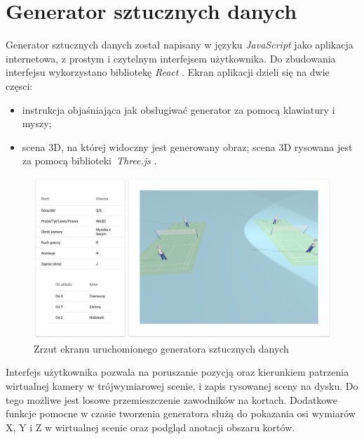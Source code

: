 \newpage
\section{Generator sztucznych danych}

Generator sztucznych danych został napisany w języku \textit{JavaScript} jako aplikacja internetowa, z prostym i czytelnym interfejsem użytkownika.
Do zbudowania interfejsu wykorzystano bibliotekę \textit{React} \cite{react}.
Ekran aplikacji dzieli się na dwie częsci:
\begin{itemize}
  \item instrukcja objaśniająca jak obsługiwać generator za pomocą klawiatury i myszy;
  \item scena 3D, na której widoczny jest generowany obraz; scena 3D rysowana jest za pomocą biblioteki~\textit{Three.js} \cite{threejs}.
\end{itemize}

\begin{figure}[!htb]
  \includegraphics[width=\linewidth]{./generator_3.png}
    \caption{Zrzut ekranu uruchomionego generatora sztucznych danych}
\end{figure}

Interfejs użytkownika pozwala na poruszanie pozycją oraz kierunkiem patrzenia wirtualnej kamery w trójwymiarowej scenie, i zapis rysowanej sceny na dysku. Do tego możliwe jest losowe przemieszczenie zawodników na kortach. Dodatkowe funkcje pomocne w czasie tworzenia generatora służą do pokazania osi wymiarów X, Y i Z w wirtualnej scenie oraz podgląd anotacji obszaru kortów.
